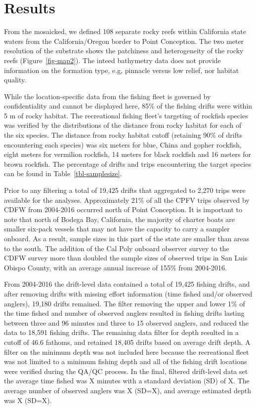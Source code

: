 \documentclass[
  12pt,
  authoryear,
  preprint,
  3p]{elsarticle}
\begin{document}
\hypertarget{results}{%
\section{Results}\label{results}}

From the mosaicked, we defined 108 separate rocky reefs within
California state waters from the California/Oregon border to Point
Conception. The two meter resolution of the substrate shows the
patchiness and heterogeneity of the rocky reefs (Figure~\ref{fig-map2}).
The inteed bathymetry data does not provide information on the formation
type, e.g, pinnacle versus low relief, nor habitat quality.

While the location-specific data from the fishing fleet is governed by
confidentiality and cannot be displayed here, 85\% of the fishing drifts
were within 5 m of rocky habitat. The recreational fishing fleet's
targeting of rockfish species was verified by the distributions of the
distance from rocky habitat for each of the six species. The distance
from rocky habitat cutoff (retaining 90\% of drifts encountering each
species) was six meters for blue, China and gopher rockfish, eight
meters for vermilion rockfish, 14 meters for black rockfish and 16
meters for brown rockfish. The percentage of drifts and trips
encountering the target species can be found in
Table~\ref{tbl-samplesize}.

Prior to any filtering a total of 19,425 drifts that aggregated to 2,270
trips were available for the analyses. Approximately 21\% of all the
CPFV trips observed by CDFW from 2004-2016 occurred north of Point
Conception. It is important to note that north of Bodega Bay,
California, the majority of charter boats are smaller six-pack vessels
that may not have the capacity to carry a sampler onboard. As a result,
sample sizes in this part of the state are smaller than areas to the
south. The addition of the Cal Poly onboard observer survey to the CDFW
survey more than doubled the sample sizes of observed trips in San Luis
Obispo County, with an average annual increase of 155\% from 2004-2016.

From 2004-2016 the drift-level data contained a total of 19,425 fishing
drifts, and after removing drifts with missing effort information (time
fished and/or observed anglers), 19,180 drifts remained. The filter
removing the upper and lower 1\% of the time fished and number of
observed anglers resulted in fishing drifts lasting between three and 96
minutes and three to 15 observed anglers, and reduced the data to 18,591
fishing drifts. The remaining data filter for depth resulted in a cutoff
of 46.6 fathoms, and retained 18,405 drifts based on average drift
depth. A filter on the minimum depth was not included here because the
recreational fleet was not limited to a minimum fishing depth and all of
the fishing drift locations were verified during the QA/QC process. In
the final, filtered drift-level data set the average time fished was X
minutes with a standard deviation (SD) of X. The average number of
observed anglers was X (SD=X), and average estimated depth was X (SD=X).
\end{document}
